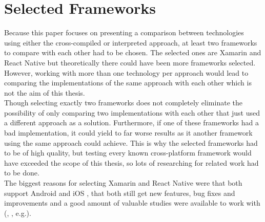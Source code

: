 \documentclass[Bachelor,BIF,english]{twbook}
\begin{document}
\chapter{Selected Frameworks}
Because this paper focuses on presenting a comparison between technologies using either the cross-compiled or interpreted approach, at least two frameworks to compare with each other had to be chosen. The selected ones are Xamarin and React Native but theoretically there could have been more frameworks selected. However, working with more than one technology per approach would lead to comparing the implementations of the same approach with each other which is not the aim of this thesis. 
\\[\baselineskip]
Though selecting exactly two frameworks does not completely eliminate the possibility of only comparing two implementations with each other that just used a different approach as a solution. Furthermore, if one of these frameworks had a bad implementation, it could yield to far worse results as it another framework using the same approach could achieve. This is why the selected frameworks had to be of high quality, but testing every known cross-platform framework would have exceeded the scope of this thesis, so lots of researching for related work had to be done. 
\\[\baselineskip]
The biggest reasons for selecting Xamarin and React Native were that both support Android and iOS \cite[p.~1]{JohanssonSderberg2018} \cite[p.~12]{ZubaBernhard2017EdPb}, that both still get new features, bug fixes and improvements \cite{XamarinRoadmap} \cite{ReactNativeRoadmap} and a good amount of valuable studies were available to work with (\cite{Hansson_Vidhall_2016}, \cite{MartinezLecomte2018}, \cite{GaouarBenamarBendimerad2016} e.g.).
\end{document}
